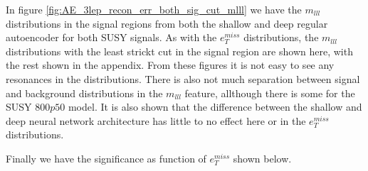 In figure \ref{fig:AE_3lep_recon_err_both_sig_cut_mlll} we have the  $m_{lll}$ distributions in the signal regions from both the shallow and deep regular 
autoencoder for both SUSY signals. As with the $e_T^{miss}$ distributions, the $m_{lll}$ distributions with the least strickt cut in the signal region 
are shown here, with the rest shown in the appendix. From these figures it is not easy to see any resonances in the distributions. There is also not 
much separation between signal and background distributions in the $m_{lll}$ feature, allthough there is some for the SUSY $800p50$ model. It is also 
shown that the difference between the shallow and deep neural network architecture has little to no effect here or in the $e_T^{miss}$ distributions.  \par 
Finally we have the significance as function of $e_T^{miss}$ shown below.

